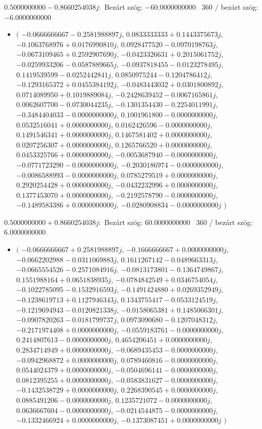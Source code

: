 \documentclass[14pt,a4paper]{article}
\begin{document}
$0.5000000000-0.8660254038j$:\
Bezárt szög: $-60.0000000000$ \
360 / bezárt szög: $-6.0000000000$\
\begin{itemize}
\item
$\big($
$-0.0666666667-0.2581988897j$, $0.0833333333+0.1443375673j$, $-0.1063768976+0.0176990810j$, $0.0928477520-0.0970198763j$, $-0.0673109465+0.2592907690j$, $-0.0423326631+0.2015061752j$, $-0.0259933206-0.0587889665j$, $-0.0937818455-0.0123278495j$, $0.1419539599-0.0252442841j$, $0.0850975244-0.1204786412j$, $-0.1293165372+0.0455384192j$, $-0.0483443032+0.0301800892j$, $0.0714089950+0.1019889084j$, $-0.2428639452-0.0067165861j$, $0.0062607700-0.0730044235j$, $-0.1301354430-0.2254011991j$, $-0.3484404033-0.0000000000j$, $0.1001961800-0.0000000000j$, $0.0532516041+0.0000000000j$, $0.0162426596-0.0000000000j$, $0.1491546341+0.0000000000j$, $0.1467581402+0.0000000000j$, $0.0207256307+0.0000000000j$, $0.1265766520+0.0000000000j$, $0.0453325766+0.0000000000j$, $-0.0053687940-0.0000000000j$, $-0.0771723290-0.0000000000j$, $-0.2030186974-0.0000000000j$, $-0.0086588993-0.0000000000j$, $0.0785279519+0.0000000000j$, $0.2920254428+0.0000000000j$, $-0.0432232996+0.0000000000j$, $0.1377453070+0.0000000000j$, $-0.2192578790-0.0000000000j$, $-0.1489583386+0.0000000000j$, $-0.0280908834-0.0000000000j$
$\big)$
\end{itemize}
$0.5000000000+0.8660254038j$:\
Bezárt szög: $60.0000000000$ \
360 / bezárt szög: $6.0000000000$\
\begin{itemize}
\item
$\big($
$-0.0666666667+0.2581988897j$, $-0.1666666667+0.0000000000j$, $-0.0662202988-0.0311069883j$, $0.1611267142-0.0489663313j$, $-0.0665554526-0.2571084916j$, $-0.0813173801-0.1364749867j$, $0.1551988164+0.0651838935j$, $-0.0784842549+0.0346754054j$, $-0.1022785095-0.1532916593j$, $-0.1491424880+0.0269352949j$, $-0.1238619713+0.1127946343j$, $0.1343755417-0.0533124519j$, $-0.1219694943-0.0120821338j$, $-0.0158065381+0.1485066301j$, $-0.0907820263-0.0181799737j$, $0.0973090680-0.1207048312j$, $-0.2171974408+0.0000000000j$, $-0.0559183761-0.0000000000j$, $0.2414807613-0.0000000000j$, $0.4654206451+0.0000000000j$, $0.2834714949+0.0000000000j$, $-0.0689435453-0.0000000000j$, $-0.0942968872+0.0000000000j$, $0.0789460816-0.0000000000j$, $0.0544024379+0.0000000000j$, $-0.0504696141-0.0000000000j$, $0.0812395255+0.0000000000j$, $-0.0583831627-0.0000000000j$, $-0.1432538729+0.0000000000j$, $0.2268390545+0.0000000000j$, $0.0885491206-0.0000000000j$, $0.1235721072-0.0000000000j$, $0.0636667604-0.0000000000j$, $-0.0214544875-0.0000000000j$, $-0.1332466924+0.0000000000j$, $-0.1373087451+0.0000000000j$
$\big)$
\end{itemize}
\end{document}
